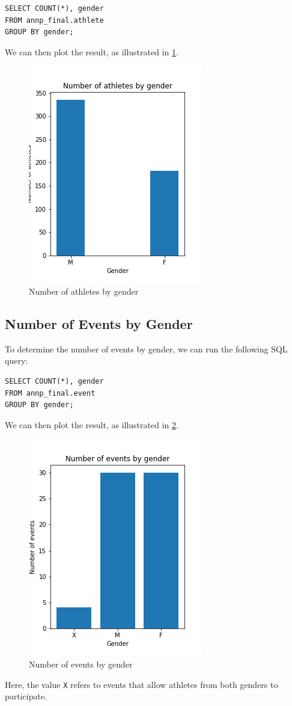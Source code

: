 \begin{verbatim}
SELECT COUNT(*), gender
FROM annp_final.athlete
GROUP BY gender;
\end{verbatim}

We can then plot the result, as illustrated in \cref{fig:athletesbygender}.

\begin{figure}[H]
    \centering
    \includegraphics[width=.4\textwidth]{img/athletesbygender}
    \caption{Number of athletes by gender}
    \label{fig:athletesbygender}
\end{figure}

\subsection{Number of Events by Gender}\label{subsec:number-of-events-by-gender}

To determine the number of events by gender, we can run the following SQL query:

\begin{verbatim}
SELECT COUNT(*), gender
FROM annp_final.event
GROUP BY gender;
\end{verbatim}

We can then plot the result, as illustrated in \cref{fig:eventsbygender}.

\begin{figure}[H]
    \centering
    \includegraphics[width=.4\textwidth]{img/eventsbygender}
    \caption{Number of events by gender}
    \label{fig:eventsbygender}
\end{figure}

Here, the value \texttt{X} refers to events that allow athletes from both genders to participate.
